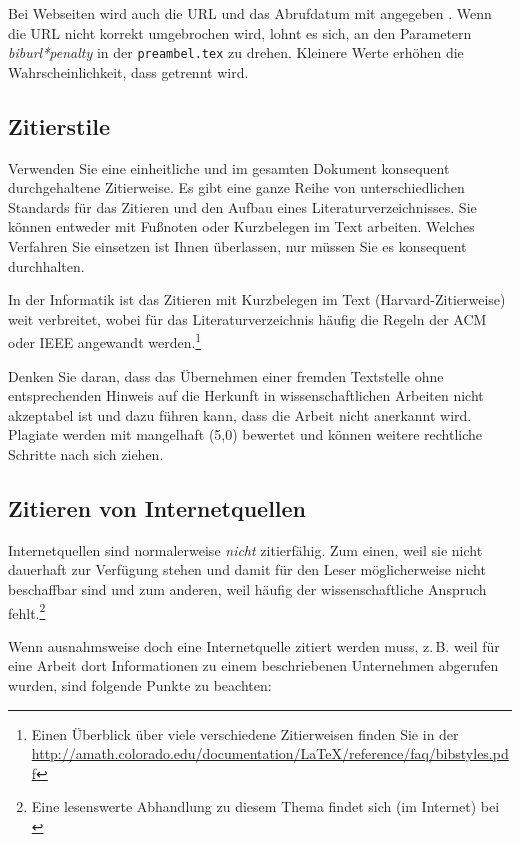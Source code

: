 Bei Webseiten wird auch die URL und das Abrufdatum mit angegeben \parencite{Gao2017}. Wenn die URL nicht korrekt umgebrochen wird, lohnt es sich, an den Parametern \textit{biburl*penalty} in der \texttt{preambel.tex} zu drehen. Kleinere Werte erhöhen die Wahrscheinlichkeit, dass getrennt wird.

\subsection{Zitierstile}

Verwenden Sie eine einheitliche und im gesamten Dokument konsequent durchgehaltene Zitierweise. Es gibt eine ganze Reihe von unterschiedlichen Standards für das Zitieren und den Aufbau eines Literaturverzeichnisses. Sie können entweder mit Fußnoten oder Kurzbelegen im Text arbeiten. Welches Verfahren Sie einsetzen ist Ihnen überlassen, nur müssen Sie es konsequent durchhalten.

In der Informatik ist das Zitieren mit Kurzbelegen im Text (Harvard-Zitierweise) weit verbreitet, wobei für das Literaturverzeichnis häufig die Regeln der \acs{ACM} oder \acs{IEEE} angewandt werden.\footnote{Einen Überblick über viele verschiedene Zitierweisen finden Sie in der \url{http://amath.colorado.edu/documentation/LaTeX/reference/faq/bibstyles.pdf}}

Denken Sie daran, dass das Übernehmen einer fremden Textstelle ohne entsprechenden Hinweis auf die Herkunft in wissenschaftlichen Arbeiten nicht akzeptabel ist und dazu führen kann, dass die Arbeit nicht anerkannt wird. Plagiate werden mit mangelhaft (5,0) bewertet und können weitere rechtliche Schritte nach sich ziehen.


\subsection{Zitieren von Internetquellen}

Internetquellen sind normalerweise \textit{nicht} zitierfähig. Zum einen, weil sie nicht dauerhaft zur Verfügung stehen und damit für den Leser möglicherweise nicht beschaffbar sind und zum anderen, weil häufig der wissenschaftliche Anspruch fehlt.\footnote{Eine lesenswerte Abhandlung zu diesem Thema findet sich (im Internet) bei \cite{Weber2006}}

Wenn ausnahmsweise doch eine Internetquelle zitiert werden muss, z.\,B. weil für eine Arbeit dort Informationen zu einem beschriebenen Unternehmen abgerufen wurden, sind folgende Punkte zu beachten:

